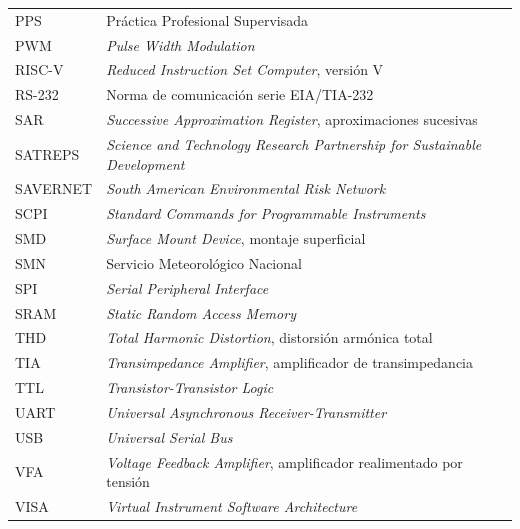 \begin{longtable}{@{}p{}p{}@{}}
PPS & Práctica Profesional Supervisada \\
PWM & \emph{Pulse Width Modulation} \\
RISC-V & \emph{Reduced Instruction Set Computer}, versión V \\
RS-232 & Norma de comunicación serie EIA/TIA-232 \\
SAR & \emph{Successive Approximation Register}, aproximaciones sucesivas \\
SATREPS & \emph{Science and Technology Research Partnership for Sustainable Development} \\
SAVERNET & \emph{South American Environmental Risk Network} \\
SCPI & \emph{Standard Commands for Programmable Instruments} \\
SMD & \emph{Surface Mount Device}, montaje superficial \\
SMN & Servicio Meteorológico Nacional \\
SPI & \emph{Serial Peripheral Interface} \\
SRAM & \emph{Static Random Access Memory} \\
THD & \emph{Total Harmonic Distortion}, distorsión armónica total \\
TIA & \emph{Transimpedance Amplifier}, amplificador de transimpedancia \\
TTL & \emph{Transistor-Transistor Logic} \\
UART & \emph{Universal Asynchronous Receiver-Transmitter} \\
USB & \emph{Universal Serial Bus} \\
VFA & \emph{Voltage Feedback Amplifier}, amplificador realimentado por tensión \\
VISA & \emph{Virtual Instrument Software Architecture} \\
\end{longtable}


\cleardoublepage